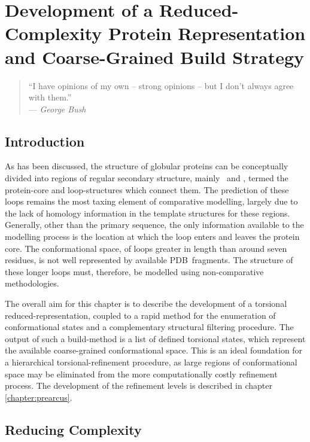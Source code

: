 \chapter{Development of a Reduced-Complexity Protein Representation and Coarse-Grained Build Strategy}
\label{chapter:reduced_rep}


\begin{quote}
``I have opinions of my own -- strong opinions -- but I don't always agree with them.'' \\
--- \textit{George Bush}
\end{quote}

\section{Introduction}

As has been discussed, the structure of globular proteins can be conceptually divided into regions of regular secondary structure, mainly \ahelixs\ and \bstrands, termed the protein-core and  loop-structures which connect them. The prediction of these loops remains the most taxing element of comparative modelling, largely due to the lack of homology information in the template structures for these regions. Generally, other than the primary sequence, the only information available to the modelling process is the location at which the loop enters and leaves the protein core. The conformational space, of loops greater in length than around seven residues, is not well represented by available PDB\ fragments. The structure of these longer loops must, therefore, be modelled using non-comparative methodologies.


The overall aim for this chapter is to describe the development of a torsional reduced-representation, coupled to a rapid method  for the enumeration  of conformational states and a complementary structural filtering procedure. The output of such a build-method is a list of   defined torsional states, which represent the available coarse-grained conformational space. This is an ideal foundation for a hierarchical torsional-refinement procedure, as large regions of conformational space may be eliminated from the more computationally costly refinement process. The development of the refinement levels is described in chapter \ref{chapter:prearcus}.
\section{Reducing Complexity}
\label{section:complexity}

